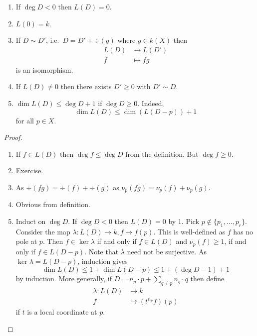 \documentclass[a4paper]{article}
\begin{document}
\begin{lemma}\leavevmode
  \begin{enumerate}
  \item If \(\deg D < 0\) then \(L(D) = 0\).
  \item \(L(0) = k\).
  \item If \(D \sim D'\), i.e.\ \(D = D' + \div(g)\) where \(g \in k(X)\) then
    \begin{align*}
      L(D) &\to L(D') \\
      f &\mapsto fg
    \end{align*}
    is an isomorphism.
  \item If \(L(D) \neq 0\) then there exists \(D' \geq 0\) with \(D' \sim D\).
  \item \(\dim L(D) \leq \deg D + 1\) if \(\deg D \geq 0\). Indeed,
    \[
      \dim L(D) \leq \dim (L(D - p)) + 1
    \]
    for all \(p \in X\).
  \end{enumerate}
\end{lemma}

\begin{proof}\leavevmode
  \begin{enumerate}
  \item If \(f \in L(D)\) then \(\deg f \leq \deg D\) from the definition. But \(\deg f \geq 0\).
  \item Exercise.
  \item As \(\div (fg) = \div(f) + \div(g)\) as \(\nu_p(fg) = \nu_p(f) + \nu_p(g)\).
  \item Obvious from definition.
  \item Induct on \(\deg D\). If \(\deg D < 0\) then \(L(D) = 0\) by 1. Pick \(p \notin \{p_1, \dots, p_r\}\). Consider the map \(\lambda: L(D) \to k, f \mapsto f(p)\). This is well-defined as \(f\) has no pole at \(p\). Then \(f \in \ker \lambda\) if and only if \(f \in L(D)\) and \(\nu_p(f) \geq 1\), if and only if \(f \in L(D - p)\). Note that \(\lambda\) need not be surjective. As \(\ker \lambda = L(D - p)\), induction gives
    \[
      \dim L(D) \leq 1 + \dim L(D - p) \leq 1 + (\deg D - 1) + 1
    \]
    by induction. More generally, if \(D = n_p \cdot p + \sum_{q \neq p} n_q \cdot q\) then define
    \begin{align*}
      \lambda: L(D) &\to k \\
      f &\mapsto (t^{n_p} f)(p)
    \end{align*}
    if \(t\) is a local coordinate at \(p\).
  \end{enumerate}
\end{proof}
\end{document}
